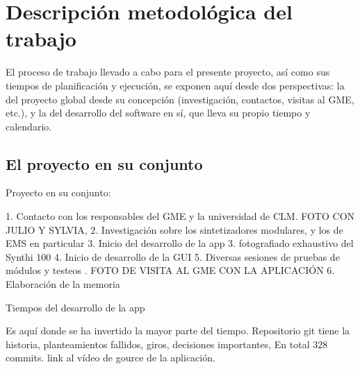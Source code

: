 \chapter{Descripción metodológica del trabajo}

El proceso de trabajo llevado a cabo para el presente proyecto, así como sus tiempos de planificación y ejecución, se exponen aquí desde dos perspectivas: la del proyecto global desde su concepción (investigación, contactos, visitas al GME, etc.), y la del desarrollo del software en sí, que lleva su propio tiempo y calendario. 

\section{El proyecto en su conjunto}



Proyecto en su conjunto:

1. Contacto con los responsables del GME y la universidad de CLM. FOTO CON JULIO Y SYLVIA, 
2. Investigación sobre los sintetizadores modulares, y los de EMS en particular
3. Inicio del desarrollo de la app
3. fotografiado exhaustivo del Synthi 100
4. Inicio de desarrollo de la GUI
5. Diversas sesiones de pruebas de módulos y testeos . FOTO DE VISITA AL GME CON LA APLICACIÓN
6. Elaboración de la memoria



Tiempos del desarrollo de la app

Es aquí donde se ha invertido la mayor parte del tiempo.
Repositorio git tiene la historia, planteamientos fallidos, giros, decisiones importantes, En total 328 commits.
link al vídeo de gource de la aplicación.


\begin{figure}
	\centering
	\caption[]{}
	\label{fig:}
\end{figure}
